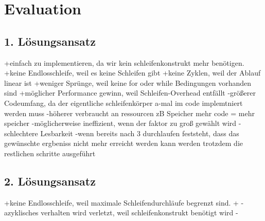 \documentclass{article}
\begin{document}
    \newpage
    \section{Evaluation}
    \label{Evaluation}
    \subsection{1. Lösungsansatz}
    +einfach zu implementieren, da wir kein schleifenkonstrukt mehr benötigen.
    +keine Endlosschleife, weil es keine Schleifen gibt
    +keine Zyklen, weil der Ablauf linear ist
    +weniger Sprünge, weil keine for oder while Bedingungen vorhanden sind
    +möglicher Performance gewinn, weil Schleifen-Overhead entfällt
    -größerer Codeumfang, da der eigentliche schleifenkörper a-mal im code implemtniert werden muss 
    -höherer verbraucht an ressourcen zB Speicher mehr code = mehr speicher
    -möglicherweise ineffizient, wenn der faktor zu groß gewählt wird
    -schlechtere Lesbarkeit
    -wenn bereits nach 3 durchlaufen feststeht, dass das gewünschte ergbeniss nicht mehr erreicht werden kann werden trotzdem die restlichen schritte ausgeführt
    \subsection{2. Lösungsansatz}
    +keine Endlosschleife, weil maximale Schleifendurchläufe begrenzt sind.
    +
    -azyklisches verhalten wird verletzt, weil schleifenkonstrukt benötigt wird
    -
    \newpage
    \renewcommand{\refname}{}
\end{document}
